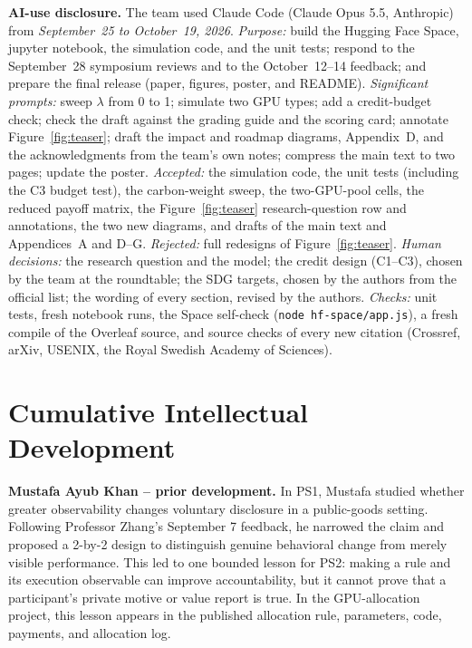 \textbf{AI-use disclosure.} The team used Claude Code (Claude Opus 5.5, Anthropic) from \emph{September~25 to October~19, 2026}.
\emph{Purpose:} build the Hugging Face Space, jupyter notebook, the simulation code, and the unit tests; respond to the September~28 symposium reviews and to the October~12--14 feedback; and prepare the final release (paper, figures, poster, and README).
\emph{Significant prompts:} sweep $\lambda$ from 0 to 1; simulate two GPU types; add a credit-budget check; check the draft against the grading guide and the scoring card; annotate Figure~\ref{fig:teaser}; draft the impact and roadmap diagrams, Appendix~D, and the acknowledgments from the team's own notes; compress the main text to two pages; update the poster.
\emph{Accepted:} the simulation code, the unit tests (including the C3 budget test), the carbon-weight sweep, the two-GPU-pool cells, the reduced payoff matrix, the Figure~\ref{fig:teaser} research-question row and annotations, the two new diagrams, and drafts of the main text and Appendices~A and D--G. \emph{Rejected:} full redesigns of Figure~\ref{fig:teaser}.
\emph{Human decisions:} the research question and the model; the credit design (C1--C3), chosen by the team at the roundtable; the SDG targets, chosen by the authors from the official list; the wording of every section, revised by the authors.
\emph{Checks:} unit tests, fresh notebook runs, the Space self-check (\texttt{node hf-space/app.js}), a fresh compile of the Overleaf source, and source checks of every new citation (Crossref, arXiv, USENIX, the Royal Swedish Academy of Sciences).

\section{Cumulative Intellectual Development}
\textbf{Mustafa Ayub Khan -- prior development.} In PS1, Mustafa studied whether greater observability changes voluntary disclosure in a public-goods setting. Following Professor Zhang's September 7 feedback, he narrowed the claim and proposed a 2-by-2 design to distinguish genuine behavioral change from merely visible performance. This led to one bounded lesson for PS2: making a rule and its execution observable can improve accountability, but it cannot prove that a participant's private motive or value report is true. In the GPU-allocation project, this lesson appears in the published allocation rule, parameters, code, payments, and allocation log.

